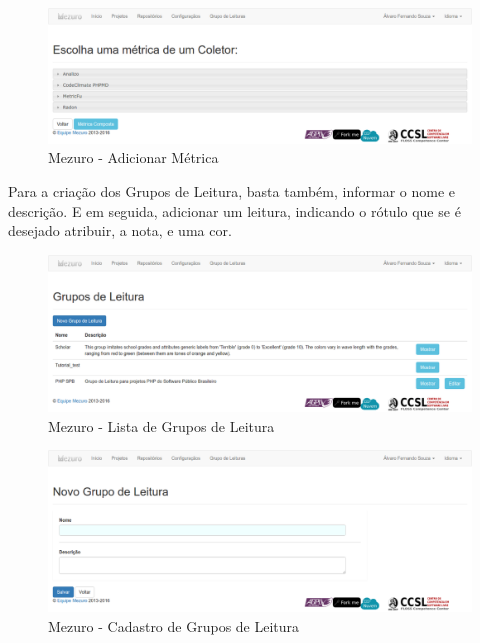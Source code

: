 \begin{figure}[!htb]
	\centering
    \includegraphics[keepaspectratio=true,scale=0.3]
    {figuras/mezuro-configuracao-add-metric.eps}
  \caption{Mezuro - Adicionar Métrica}
	\label{fig:mezuro-configuracao-add-metric}
\end{figure}

\newpage

Para a criação dos Grupos de Leitura, basta também, informar o nome e descrição.
E em seguida, adicionar um leitura, indicando o rótulo que se é desejado atribuir,
a nota, e uma cor.

\begin{figure}[!htb]
	\centering
    \includegraphics[keepaspectratio=true,scale=0.3]
    {figuras/mezuro-leituras.eps}
  \caption{Mezuro - Lista de Grupos de Leitura}
	\label{fig:mezuro-leituras}
\end{figure}

\begin{figure}[!htb]
	\centering
    \includegraphics[keepaspectratio=true,scale=0.3]
    {figuras/mezuro-leitura-cadastro.eps}
  \caption{Mezuro - Cadastro de Grupos de Leitura}
	\label{fig:mezuro-leitura-cadastro}
\end{figure}


